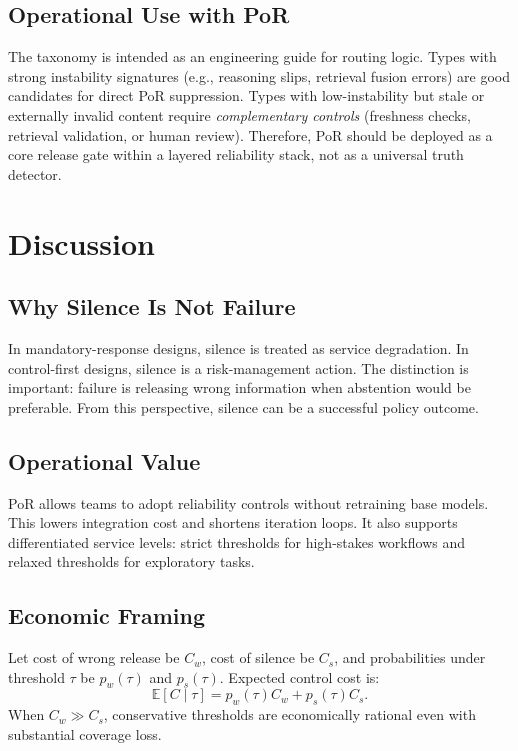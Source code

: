 \documentclass[11pt]{article}
\begin{document}
\subsection{Operational Use with PoR}
The taxonomy is intended as an engineering guide for routing logic. Types with strong instability signatures (e.g., reasoning slips, retrieval fusion errors) are good candidates for direct PoR suppression. Types with low-instability but stale or externally invalid content require \emph{complementary controls} (freshness checks, retrieval validation, or human review). Therefore, PoR should be deployed as a core release gate within a layered reliability stack, not as a universal truth detector.


\section{Discussion}
\subsection{Why Silence Is Not Failure}
In mandatory-response designs, silence is treated as service degradation. In control-first designs, silence is a risk-management action. The distinction is important: failure is releasing wrong information when abstention would be preferable. From this perspective, silence can be a successful policy outcome.

\subsection{Operational Value}
PoR allows teams to adopt reliability controls without retraining base models. This lowers integration cost and shortens iteration loops. It also supports differentiated service levels: strict thresholds for high-stakes workflows and relaxed thresholds for exploratory tasks.

\subsection{Economic Framing}
Let cost of wrong release be $C_w$, cost of silence be $C_s$, and probabilities under threshold $\tau$ be $p_w(\tau)$ and $p_s(\tau)$. Expected control cost is:
\begin{equation}
\mathbb{E}[C\mid\tau] = p_w(\tau)C_w + p_s(\tau)C_s.
\end{equation}
When $C_w \gg C_s$, conservative thresholds are economically rational even with substantial coverage loss.
\end{document}

